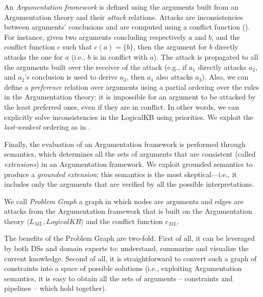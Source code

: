 An \emph{Argumentation framework} is defined using the arguments built from an Argumentation theory and their \emph{attack} relations.
Attacks are inconsistencies between arguments' conclusions and are computed using a conflict function ().
For instance, given two arguments concluding respectively $a$ and $b$, and the conflict function $c$ such that $c(a) = \{b\}$, then the argument for $b$ directly attacks the one for $a$ (i.e., $b$ is in conflict with $a$).
The attack is propagated to all the arguments built over the receiver of the attack (e.g., if $a_1$ directly attacks $a_2$, and $a_2$'s conclusion is used to derive $a_3$, then $a_1$ also attacks $a_3$).
Also, we can define a \emph{preference} relation over arguments using a partial ordering over the rules in the Argumentation theory:
it is impossible for an argument to be attacked by the least preferred ones, even if they are in conflict.
In other words, we can explicitly solve inconsistencies in the LogicalKB using priorities.
We exploit the \emph{last-weakest} ordering as in \cite{Modgil2014aspic+}.

Finally, the evaluation of an Argumentation framework is performed through semantics, which determines all the sets of arguments that are consistent (called \emph{extensions}) in an Argumentation framework.
We exploit grounded semantics \cite{Dung1995abstractArg} to produce a \emph{grounded extension}; this semantics is the most skeptical---i.e., it includes only the arguments that are verified by all the possible interpretations. %

\begin{definition}
We call \emph{Problem Graph} a graph in which nodes are arguments and edges are attacks from the Argumentation framework that is built on the Argumentation theory $\langle L_{ML}, LogicalKB \rangle$ and the conflict function $c_{ML}$.
\end{definition}

The benefits of the Problem Graph are two-fold.
First of all, it can be leveraged by both DSs and domain experts to: understand, summarize and visualize the current knowledge.
Second of all, it is straightforward to convert such a graph of constraints into a space of possible solutions (i.e., exploiting Argumentation semantics, it is easy to obtain all the sets of arguments -- constraints and pipelines -- which hold together).

